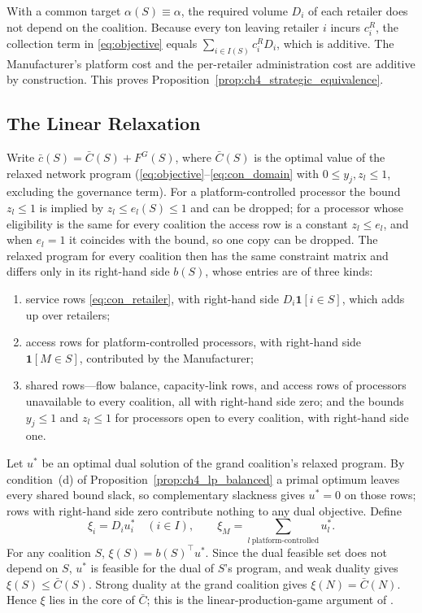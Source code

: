 With a common target $\alpha(S)\equiv\alpha$, the required volume $D_i$ of each
retailer does not depend on the coalition. Because every ton leaving retailer
$i$ incurs $c_i^R$, the collection term in \eqref{eq:objective} equals
$\sum_{i\in I(S)}c_i^RD_i$, which is additive. The Manufacturer's platform cost
and the per-retailer administration cost are additive by construction. This
proves Proposition~\ref{prop:ch4_strategic_equivalence}.

\subsection{The Linear Relaxation}

Write $\bar c(S)=\bar C(S)+F^G(S)$, where $\bar C(S)$ is the optimal value of
the relaxed network program (\eqref{eq:objective}--\eqref{eq:con_domain} with
$0\leq y_j,z_l\leq1$, excluding the governance term). For a platform-controlled
processor the bound $z_l\leq1$ is implied by $z_l\leq e_l(S)\leq1$ and can be
dropped; for a processor whose eligibility is the same for every coalition the
access row is a constant $z_l\leq e_l$, and when $e_l=1$ it coincides with the
bound, so one copy can be dropped. The relaxed program for
every coalition then has the same constraint matrix and differs only in its
right-hand side $b(S)$, whose entries are of three kinds:
\begin{enumerate}
\item service rows \eqref{eq:con_retailer}, with right-hand side
$D_i\mathbf{1}[i\in S]$, which adds up over retailers;
\item access rows for platform-controlled processors, with right-hand side
$\mathbf{1}[M\in S]$, contributed by the Manufacturer;
\item shared rows---flow balance, capacity-link rows, and access rows of
processors unavailable to every coalition, all with right-hand side zero; and
the bounds $y_j\leq1$ and $z_l\leq1$ for processors open to every coalition,
with right-hand side one.
\end{enumerate}
Let $u^*$ be an optimal dual solution of the grand coalition's relaxed program.
By condition~(d) of Proposition~\ref{prop:ch4_lp_balanced} a primal optimum
leaves every shared bound slack, so complementary slackness gives $u^*=0$ on
those rows; rows with right-hand side zero contribute nothing to any dual
objective. Define
\begin{equation*}
\xi_i=D_iu^*_i\quad(i\in I),
\qquad
\xi_M=\sum_{l\ \text{platform-controlled}}u^*_l .
\end{equation*}
For any coalition $S$, $\xi(S)=b(S)^{\top}u^*$. Since the dual feasible set does
not depend on $S$, $u^*$ is feasible for the dual of $S$'s program, and weak
duality gives $\xi(S)\leq\bar C(S)$. Strong duality at the grand coalition
gives $\xi(N)=\bar C(N)$. Hence $\xi$ lies in the core of $\bar C$; this is the
linear-production-game argument of \cite{Owen1975}.


